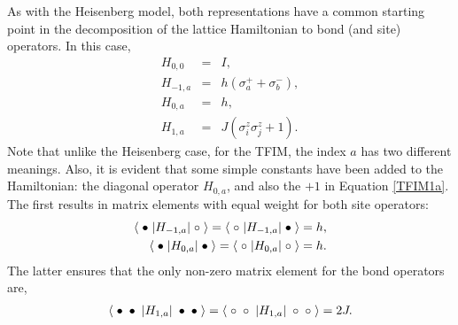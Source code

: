 \documentclass[vecphys]{svmult}
\begin{document}
As with the Heisenberg model, both representations have a common starting point in the decomposition of the lattice Hamiltonian to bond (and site) operators.  In this case, 
\begin{eqnarray}
H_{0,0} &=& I, \label {TFIM00} \\
H_{-1,a} &=& h(\sigma^+_a + \sigma^-_b), \label{TFIM-1a} \\
H_{0,a} &=& h, \\
H_{1,a} &=& J (\sigma^z_i \sigma^z_j + 1).  \label{TFIM1a}
\end{eqnarray}
Note that unlike the Heisenberg case, for the TFIM, the index $a$ has two different meanings.  Also, it is evident that some simple constants have been added to the Hamiltonian:  the diagonal operator $H_{0,a}$, and also the $+1$ in Equation \ref{TFIM1a}.  The first results in matrix elements with equal weight for both site operators:
\begin{eqnarray}
\langle \hspace{1mm} \bullet \hspace{1mm}  | H_{-1,a} |\hspace{1mm} \circ \hspace{1mm} \rangle = 
\langle \hspace{1mm} \circ \hspace{1mm}  | H_{-1,a} |\hspace{1mm} \bullet \hspace{1mm} \rangle = h, \label {Tw1} \\
\langle \hspace{1mm}  \bullet \hspace{1mm}  | H_{0,a} | \hspace{1mm} \bullet \hspace{1mm} \rangle = 
\langle \hspace{1mm}  \circ \hspace{1mm}  | H_{0,a} | \hspace{1mm} \circ \hspace{1mm} \rangle = h. \label{Tw2}
\end{eqnarray} 
The latter ensures that the only non-zero matrix element for the bond operators are,
\begin{eqnarray}
\langle \hspace{1mm} \bullet \hspace{1mm}  \bullet \hspace{1mm}  | H_{1,a} | \hspace{1mm} \bullet \hspace{1mm} \bullet \hspace{1mm} \rangle = 
\langle \hspace{1mm} \circ \hspace{1mm}  \circ \hspace{1mm}  | H_{1,a} | \hspace{1mm} \circ \hspace{1mm} \circ \hspace{1mm} \rangle = 2J. \label {Tfimdiag} 
\end{eqnarray}
\end{document}
